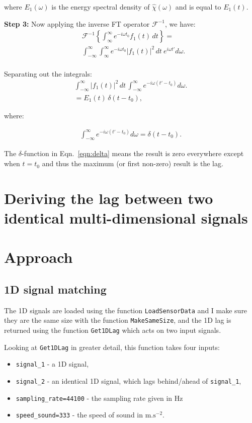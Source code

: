 \documentclass[%
 reprint,
 amsmath,amssymb,
 aps,
floatfix,
]{revtex4-2}
\begin{document}
where $E_1(\omega)$ is the energy spectral density of $\hat{\chi}(\omega)$ and is equal to $E_1(t)$.

\textbf{Step 3:} Now applying the inverse FT operator $\mathcal{F}^{-1}$, we have:
\begin{align}
    &\mathcal{F}^{-1}\left\{\int^{\infty}_{\infty} e^{-i\omega t_0}f_{1}(t)\,dt\right\}= \\
    &\int_{-\infty}^{\infty}\int^{\infty}_{\infty} e^{-i\omega t_0}|f_{1}(t)|^{2}\,dt\: e^{i\omega t'} d\omega. \\
\end{align}

Separating out the integrals:
\begin{align}
    \int_{-\infty}^{\infty} |f_{1}(t)|^{2}\,dt\, \int_{-\infty}^{\infty} e^{-i\omega (t'-t_0)} d\omega. \\
    =E_1(t)\,\delta(t-t_0),\label{eqn:delta}
\end{align}

where:

\begin{align}
    \int_{-\infty}^{\infty} e^{-i\omega (t'-t_0)} d\omega = \delta(t-t_0).
\end{align}

The $\delta$-function in Eqn.~\ref{eqn:delta} means the result is zero everywhere except when $t=t_0$ and thus the maximum (or first non-zero) result is the lag.

\section{Deriving the lag between two identical multi-dimensional signals}

\section{Approach}

\subsection{1D signal matching}
The 1D signals are loaded using the function \texttt{LoadSensorData} and I make sure they are the same size with the function \texttt{MakeSameSize}, and the 1D lag is returned using the function \texttt{Get1DLag} which acts on two input signals.

Looking at \texttt{Get1DLag} in greater detail, this function takes four inputs:

\begin{itemize}
    \item \texttt{signal\_1} - a 1D signal,
    \item \texttt{signal\_2} - an identical 1D signal, which lags behind/ahead of \texttt{signal\_1},
    \item \texttt{sampling\_rate=44100} - the sampling rate given in Hz
    \item \texttt{speed\_sound=333} - the speed of sound in $\mathrm{m.s^{-2}}$.
\end{itemize}
\end{document}
